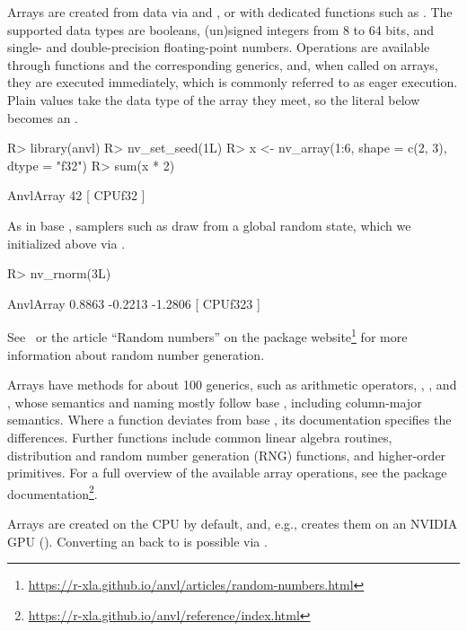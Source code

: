 \documentclass[article,shortnames]{jss}
\renewenvironment{CodeChunk}{\par\addvspace{0.6\baselineskip}\noindent\begin{minipage}{\linewidth}}{\end{minipage}\par\vspace{0.6\baselineskip}}
\begin{document}
Arrays are created from  data via  and , or with dedicated functions such as .
The supported data types are booleans, (un)signed integers from 8 to 64 bits, and single- and double-precision floating-point numbers.
Operations are available through  functions and the corresponding  generics, and, when called on arrays, they are executed immediately, which is commonly referred to as eager execution.
Plain  values take the data type of the array they meet, so the literal  below becomes an .

\begin{CodeChunk}
\begin{CodeInput}
R> library(anvl)
R> nv_set_seed(1L)
R> x <- nv_array(1:6, shape = c(2, 3), dtype = "f32")
R> sum(x * 2)
\end{CodeInput}
\begin{CodeOutput}
AnvlArray
 42
[ CPUf32{} ]
\end{CodeOutput}

As in base , samplers such as  draw from a global random state, which we initialized above via .


\begin{CodeInput}
R> nv_rnorm(3L)
\end{CodeInput}
\begin{CodeOutput}
AnvlArray
  0.8863
 -0.2213
 -1.2806
[ CPUf32{3} ]
\end{CodeOutput}
\end{CodeChunk}

See~ or the article ``Random numbers'' on the package website\footnote{\url{https://r-xla.github.io/anvl/articles/random-numbers.html}} for more information about random number generation.

Arrays have methods for about 100  generics, such as arithmetic operators, , \code{\%*\%}, and \code{[}, whose semantics and naming mostly follow base , including column-major semantics.
Where a function deviates from base , its documentation specifies the differences.
Further functions include common linear algebra routines, distribution and random number generation (RNG) functions, and higher-order primitives.
For a full overview of the available array operations, see the package documentation\footnote{\url{https://r-xla.github.io/anvl/reference/index.html}}.

Arrays are created on the CPU by default, and, e.g.,  creates them on an NVIDIA GPU ().
Converting an  back to  is possible via .
\end{document}
